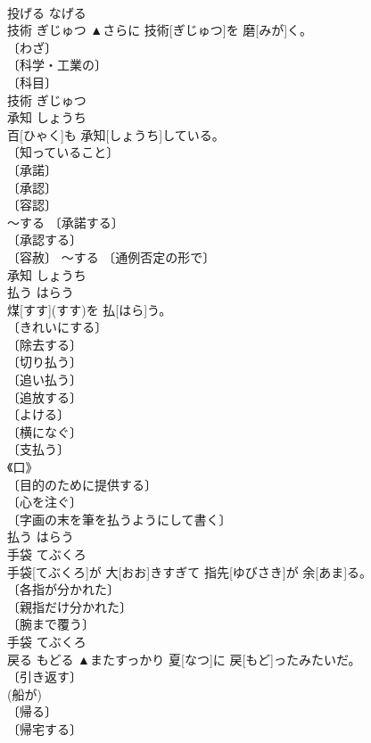 \documentclass[8pt]{extreport}
\begin{document}
\begin{CJK}{UTF8}{min}
\\	投げる	なげる	
\\	技術	ぎじゅつ	▲さらに 技術[ぎじゅつ]を 磨[みが]く。	
\\	〔わざ〕 
\\	〔科学・工業の〕 
\\	〔科目〕 
\\	[⇒ぎじゅつかていか]	技術	ぎじゅつ	
\\	承知	しょうち	
\\	百[ひゃく]も 承知[しょうち]している。	
\\	〔知っていること〕 
\\	〔承諾〕 
\\	〔承認〕 
\\	〔容認〕 
\\	～する 〔承諾する〕 
\\	〔承認する〕 
\\	〔容赦〕 ～する 〔通例否定の形で〕 
\\	承知	しょうち	
\\	払う	はらう	
\\	煤[すす](すす)を 払[はら]う。	
\\	〔きれいにする〕 
\\	〔除去する〕 
\\	〔切り払う〕 
\\	〔追い払う〕 
\\	〔追放する〕 
\\	〔よける〕 
\\	〔横になぐ〕 
\\	〔支払う〕 
\\	《口》 
\\	〔目的のために提供する〕 
\\	〔心を注ぐ〕 
\\	〔字画の末を筆を払うようにして書く〕 
\\	払う	はらう	
\\	手袋	てぶくろ	
\\	手袋[てぶくろ]が 大[おお]きすぎて 指先[ゆびさき]が 余[あま]る。	
\\	〔各指が分かれた〕 
\\	〔親指だけ分かれた〕 
\\	〔腕まで覆う〕 
\\	手袋	てぶくろ	
\\	戻る	もどる	▲またすっかり 夏[なつ]に 戻[もど]ったみたいだ。	
\\	〔引き返す〕 
\\	(船が) 
\\	〔帰る〕 
\\	〔帰宅する〕 

\end{CJK}
\end{document}
